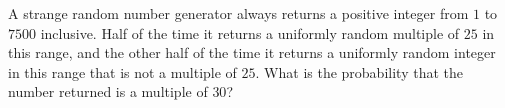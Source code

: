 A strange random number generator always returns a positive integer from $1$ to $7500$ inclusive. Half of the time it returns a uniformly random multiple of $25$ in this range, and the other half of the time it returns a uniformly random integer in this range that is not a multiple of $25$. What is the probability that the number returned is a multiple of $30$?
